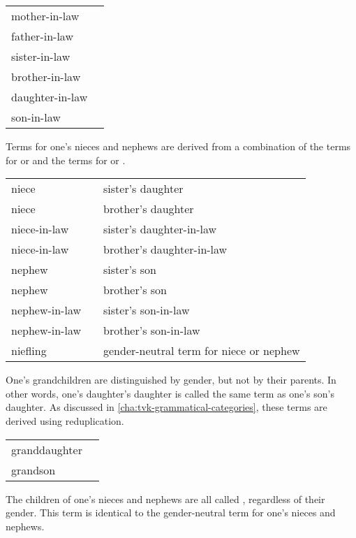 \exdisplay\noexno
\begin{tabu} {l l}
	mother-in-law & \\
	father-in-law & \\
	sister-in-law & \\
	brother-in-law & \\
	daughter-in-law & \\
	son-in-law & \\
\end{tabu}
\xe

Terms for one's nieces and nephews are derived from a combination of the terms for  or  and the terms for  or .

\exdisplay\noexno
\begin{tabu} {l l l}
	niece &  & sister's daughter\\
	niece &  & brother's daughter\\
	niece-in-law &  & sister's daughter-in-law\\
	niece-in-law &  & brother's daughter-in-law\\
	nephew &  & sister's son\\
	nephew &  & brother's son\\
	nephew-in-law &  & sister's son-in-law\\
	nephew-in-law &  & brother's son-in-law\\
	niefling &  & gender-neutral term for niece or nephew\\
\end{tabu}
\xe

One's grandchildren are distinguished by gender, but not by their parents. In other words, one's daughter's daughter is called the same term as one's son's daughter. As discussed in \autoref{cha:tvk-grammatical-categories}, these terms are derived using reduplication.

\exdisplay\noexno
\begin{tabu} {l l}
	granddaughter & \\
	grandson & \\
\end{tabu}
\xe

The children of one's nieces and nephews are all called , regardless of their gender. This term is identical to the gender-neutral term for one's nieces and nephews.

